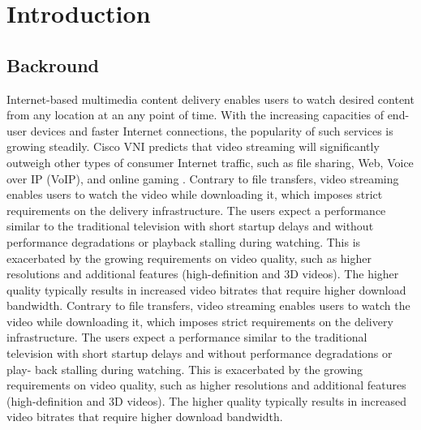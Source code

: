 \chapter{Introduction}
\section{Backround}
Internet-based multimedia content delivery enables users to watch desired content from any location at an any point of time. 
With the increasing capacities of end-user devices and faster Internet connections, the popularity of such services is growing steadily. 
Cisco VNI predicts that video streaming will significantly outweigh other types of consumer Internet traffic, such as file sharing, Web, Voice over IP (VoIP), and online gaming \cite{ciscovni}. 
Contrary to file transfers, video streaming enables users to watch the video while downloading it, which imposes strict requirements on the delivery infrastructure. 
The users expect a performance similar to the traditional television with short startup delays and without performance degradations or playback stalling during watching. This is exacerbated by the growing requirements on video quality, such as higher resolutions and additional features (high-definition and 3D videos). 
The higher quality typically results in increased video bitrates that require higher download bandwidth.
Contrary to file transfers, video streaming enables users to watch the video while downloading it, which imposes strict requirements on the delivery infrastructure. 
The users expect a performance similar to the traditional television with short startup delays and without performance degradations or play- back stalling during watching. 
This is exacerbated by the growing requirements on video quality, such as higher resolutions and additional features (high-definition and 3D videos). 
The higher quality typically results in increased video bitrates that require higher download bandwidth.

